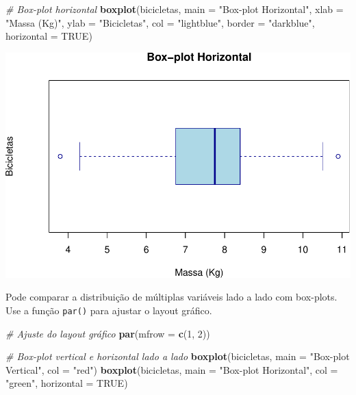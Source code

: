 \documentclass[
]{book}
\newenvironment{Shaded}{\begin{snugshade}}{\end{snugshade}}
\newcommand{\AttributeTok}[1]{\textcolor[rgb]{0.13,0.29,0.53}{#1}}
\newcommand{\CommentTok}[1]{\textcolor[rgb]{0.56,0.35,0.01}{\textit{#1}}}
\newcommand{\ConstantTok}[1]{\textcolor[rgb]{0.56,0.35,0.01}{#1}}
\newcommand{\DecValTok}[1]{\textcolor[rgb]{0.00,0.00,0.81}{#1}}
\newcommand{\FunctionTok}[1]{\textcolor[rgb]{0.13,0.29,0.53}{\textbf{#1}}}
\newcommand{\NormalTok}[1]{#1}
\newcommand{\StringTok}[1]{\textcolor[rgb]{0.31,0.60,0.02}{#1}}
\begin{document}
\begin{Shaded}
\begin{Highlighting}[]
\CommentTok{\# Box{-}plot horizontal}
\FunctionTok{boxplot}\NormalTok{(bicicletas, }
        \AttributeTok{main =} \StringTok{"Box{-}plot Horizontal"}\NormalTok{,}
        \AttributeTok{xlab =} \StringTok{"Massa (Kg)"}\NormalTok{,}
        \AttributeTok{ylab =} \StringTok{"Bicicletas"}\NormalTok{,}
        \AttributeTok{col =} \StringTok{"lightblue"}\NormalTok{,}
        \AttributeTok{border =} \StringTok{"darkblue"}\NormalTok{,}
        \AttributeTok{horizontal =} \ConstantTok{TRUE}\NormalTok{)}
\end{Highlighting}
\end{Shaded}

\includegraphics{introR_files/figure-latex/unnamed-chunk-176-1.pdf}

Pode comparar a distribuição de múltiplas variáveis lado a lado com
box-plots. Use a função \texttt{par()} para ajustar o layout gráfico.

\begin{Shaded}
\begin{Highlighting}[]
\CommentTok{\# Ajuste do layout gráfico}
\FunctionTok{par}\NormalTok{(}\AttributeTok{mfrow =} \FunctionTok{c}\NormalTok{(}\DecValTok{1}\NormalTok{, }\DecValTok{2}\NormalTok{))}

\CommentTok{\# Box{-}plot vertical e horizontal lado a lado}
\FunctionTok{boxplot}\NormalTok{(bicicletas, }\AttributeTok{main =} \StringTok{"Box{-}plot Vertical"}\NormalTok{, }\AttributeTok{col =} \StringTok{"red"}\NormalTok{)}
\FunctionTok{boxplot}\NormalTok{(bicicletas, }\AttributeTok{main =} \StringTok{"Box{-}plot Horizontal"}\NormalTok{, }\AttributeTok{col =} \StringTok{"green"}\NormalTok{, }\AttributeTok{horizontal =} \ConstantTok{TRUE}\NormalTok{)}
\end{Highlighting}
\end{Shaded}
\end{document}
